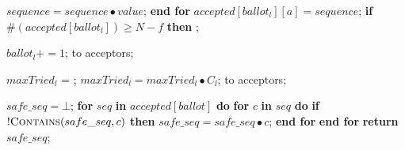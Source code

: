 \begin{algorithm}
\begin{algorithmic}[1]
		\State \hspace{\algorithmicindent}\hspace{\algorithmicindent}\hspace{\algorithmicindent}\hspace{\algorithmicindent}\hspace{\algorithmicindent}\hspace{\algorithmicindent} $sequence = sequence \bullet value$;
		\State \hspace{\algorithmicindent}\hspace{\algorithmicindent}\hspace{\algorithmicindent} \textbf{end for}
		\State \hspace{\algorithmicindent}\hspace{\algorithmicindent}\hspace{\algorithmicindent}  $accepted[ballot_l][a] = sequence$;
		\State
		\State \hspace{\algorithmicindent} \textbf{if} $\#(accepted[ballot_l]) \geq N-f$ \textbf{then} 
		\State \hspace{\algorithmicindent}\hspace{\algorithmicindent} ;

		\State
		\State $ballot_l \mathrel{+{=}} 1$;
		\State {} to acceptors;
		\EndFunction
		
		\State
		\State $maxTried_l$ = ;
		\State $maxTried_l = maxTried_l \bullet C_l$;
		\State {} to acceptors;
		\EndFunction
		
		\State
		\State $safe\_seq = \bot$;
		\State \textbf{for} $seq$ \textbf{in} $accepted[ballot]$ \textbf{do}
		\State \hspace{\algorithmicindent} \textbf{for} $c$ \textbf{in} $seq$ \textbf{do} 
		\State \hspace{\algorithmicindent}\hspace{\algorithmicindent} \textbf{if} $!\Call{Contains}{safe\_seq,c}$ \textbf{then}
		\State \hspace{\algorithmicindent}\hspace{\algorithmicindent}\hspace{\algorithmicindent} $safe\_seq =  safe\_seq \bullet c$;
		\State \hspace{\algorithmicindent} \textbf{end for}
		\State \textbf{end for}
		\State \textbf{return} $safe\_seq$;
		\EndFunction
		

\end{algorithmic}
\end{algorithm}
